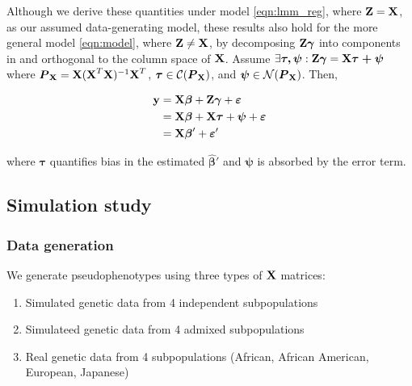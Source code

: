Although we derive these quantities under model \ref{eqn:lmm_reg}, where $\textbf{Z} = \textbf{X}$, as our assumed data-generating model, these results also hold for the more general model \ref{eqn:model}, where $\textbf{Z} \ne \textbf{X}$, by decomposing $\textbf{Z} \boldsymbol{\gamma}$ into components in and orthogonal to the column space of $\textbf{X}$. Assume $\exists \boldsymbol{\tau, \psi}: \textbf{Z} \boldsymbol{\gamma} = \textbf{X} \boldsymbol{\tau + \psi}$ where $\boldsymbol{P}_{\textbf{X}} = \textbf{X} (\textbf{X}^T \textbf{X})^{-1} \textbf{X}^T$, $\boldsymbol{\tau} \in \mathcal{C}(\boldsymbol{P}_{\textbf{X}})$, and $\boldsymbol{\psi} \in \mathcal{N}(\boldsymbol{P}_{\textbf{X}})$. Then,

\begin{align*}
    \textbf{y} &= \textbf{X}\boldsymbol{\beta} + \textbf{Z}\boldsymbol{\gamma} + \boldsymbol{\varepsilon}\\
    &= \textbf{X}\boldsymbol{\beta} + \textbf{X} \boldsymbol{\tau} + \boldsymbol{\psi} + \boldsymbol{\varepsilon}\\
    &=  \textbf{X} \boldsymbol{\beta}' + \boldsymbol{\varepsilon}'
\end{align*}

where $\boldsymbol{\tau}$ quantifies bias in the estimated $\boldsymbol{\hat{\beta}'}$ and $\boldsymbol{\psi}$ is absorbed by the error term.


\subsection{Simulation study}

\subsubsection{Data generation}
We generate pseudophenotypes using three types of $\textbf{X}$ matrices:
\begin{enumerate}
    \item Simulated genetic data from 4 independent subpopulations \cite{ochoa2019simulate}
    \item Simulateed genetic data from 4 admixed subpopulations \cite{ochoa2019simulate}
    \item Real genetic data from 4 subpopulations (African, African American, European, Japanese) \cite{efron2016computer}
\end{enumerate}

